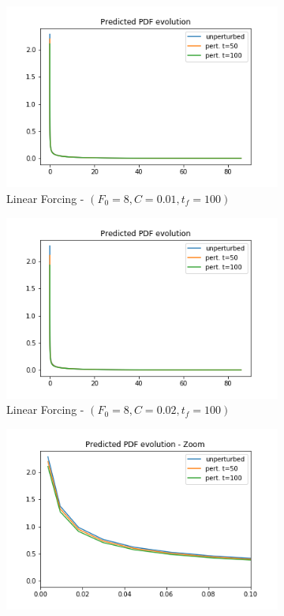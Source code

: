 \documentclass{article}
\begin{document}
\begin{figure}[!ht]
\begin{subfigure}[b]{0.48\textwidth}
		\includegraphics[width=1\linewidth]{fig/pred_pdf_energy_bin_00q_10q_LF_8_001_0_100.png}
		\caption{Linear Forcing - $(F_0=8, C=0.01, t_f=100)$}
		\label{fig:pred_pdf_energy_bin_00q_10q_LF_8_001_0_100}
	\end{subfigure}%
	\begin{subfigure}[b]{0.48\textwidth}
		\includegraphics[width=1\linewidth]{fig/pred_pdf_energy_bin_00q_10q_LF_8_002_0_100.png}
		\caption{Linear Forcing - $(F_0=8, C=0.02, t_f=100)$}
		\label{fig:pred_pdf_energy_bin_00q_10q_LF_8_002_0_100}
	\end{subfigure}
	\begin{subfigure}[b]{0.48\textwidth}
		\includegraphics[width=1\linewidth]{fig/pred_pdf_zoom_energy_bin_00q_10q_LF_8_001_0_100.png}

\end{subfigure}
\end{figure}
\end{document}

